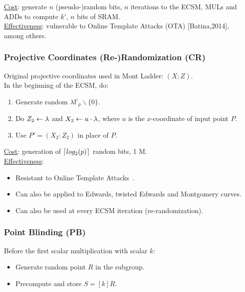 	\underline{Cost}: generate $n$ (pseudo-)random bits, $n$ iterations to the ECSM, MULs and ADDs to compute $k'$, $n$ bits of SRAM.\\
	
	\underline{Effectiveness}: vulnerable to Online Template Attacks (OTA) {[Batina,2014]}, among others.

\subsubsection{Projective Coordinates (Re-)Randomization (CR)~\cite{Coron1999}}
Original projective coordinates used in Mont Ladder: $(X:Z)$.\\
In the beginning of the ECSM, do:
\begin{enumerate}
	\item Generate random $\lambda \mathbb{F}_p \backslash \{0\}$.
	\item Do $Z_2 \leftarrow \lambda$ and $X_2 \leftarrow u \cdot \lambda$, where $u$ is the $x$-coordinate of input point $P$.
	\item Use $P'=(X_2:Z_2)$ in place of $P$.
\end{enumerate}	
\underline{Cost}: generation of $\lceil log_2(p)\rceil$ random bits, 1 M.\\
\underline{Effectiveness}: 
\begin{itemize}
	\item Resistant to Online Template Attacks~\cite{BatinaChmielewski2014}.
	\item Can also be applied to Edwards, twisted Edwards and Montgomery curves.
	\item Can also be used at every ECSM iteration (re-randomization).
\end{itemize}

\subsubsection{Point Blinding (PB)~\cite{Coron1999}}
Before the first scalar multiplication with scalar $k$:
\begin{itemize}
	\item Generate random point $R$ in the subgroup.
	\item Precompute and store $S = [k]R$.
\end{itemize}

